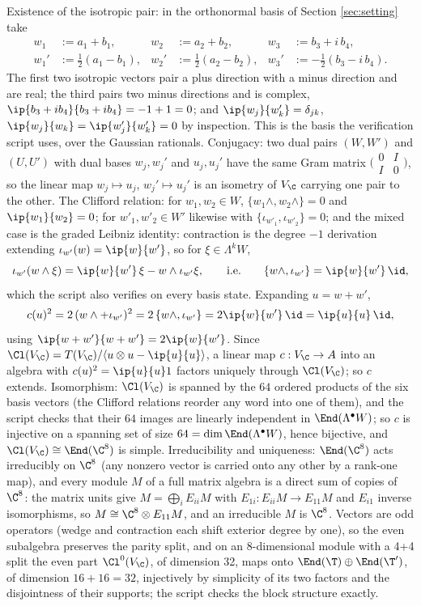 Existence of the isotropic pair: in the orthonormal basis of Section \ref{sec:setting} take
\begin{align*}
w_1 &:= a_1 + b_1, & w_2 &:= a_2 + b_2, & w_3 &:= b_3 + i\,b_4,\\
w_1' &:= \tfrac12(a_1 - b_1), & w_2' &:= \tfrac12(a_2 - b_2), & w_3' &:= -\tfrac12(b_3 - i\,b_4).
\end{align*}
The first two isotropic vectors pair a plus direction with a minus direction and are real; the third pairs two minus directions and is complex, $\ip{b_3 + ib_4}{b_3 + ib_4} = -1 + 1 = 0$; and $\ip{w_j}{w_k'} = \delta_{jk}$, $\ip{w_j}{w_k} = \ip{w_j'}{w_k'} = 0$ by inspection. This is the basis the verification script uses, over the Gaussian rationals. Conjugacy: two dual pairs $(W, W')$ and $(U, U')$ with dual bases $w_j, w_j'$ and $u_j, u_j'$ have the same Gram matrix $\bigl(\begin{smallmatrix} 0 & I \\ I & 0\end{smallmatrix}\bigr)$, so the linear map $w_j \mapsto u_j$, $w_j' \mapsto u_j'$ is an isometry of $V_\C$ carrying one pair to the other. The Clifford relation: for $w_1, w_2 \in W$, $\{w_1\wedge, w_2\wedge\} = 0$ and $\ip{w_1}{w_2} = 0$; for $w'_1, w'_2 \in W'$ likewise with $\{\iota_{w'_1}, \iota_{w'_2}\} = 0$; and the mixed case is the graded Leibniz identity: contraction is the degree $-1$ derivation extending $\iota_{w'}(w) = \ip{w}{w'}$, so for $\xi \in \Lambda^k W$,
\[
\iota_{w'}(w\wedge\xi) = \ip{w}{w'}\,\xi - w\wedge\iota_{w'}\xi, \qquad\text{i.e.}\qquad \{w\wedge, \iota_{w'}\} = \ip{w}{w'}\,\id ,
\]
which the script also verifies on every basis state. Expanding $u = w + w'$,
\[
c(u)^2 = 2\,(w\wedge + \iota_{w'})^2 = 2\,\{w\wedge, \iota_{w'}\} = 2\ip{w}{w'}\,\id = \ip{u}{u}\,\id ,
\]
using $\ip{w+w'}{w+w'} = 2\ip{w}{w'}$. Since $\Cl(V_\C) = T(V_\C)/\langle u\otimes u - \ip{u}{u}\rangle$, a linear map $c: V_\C \to A$ into an algebra with $c(u)^2 = \ip{u}{u}1$ factors uniquely through $\Cl(V_\C)$; so $c$ extends. Isomorphism: $\Cl(V_\C)$ is spanned by the $64$ ordered products of the six basis vectors (the Clifford relations reorder any word into one of them), and the script checks that their $64$ images are linearly independent in $\End(\Lambda^\bullet W)$; so $c$ is injective on a spanning set of size $64 = \dim \End(\Lambda^\bullet W)$, hence bijective, and $\Cl(V_\C) \cong \End(\C^8)$ is simple. Irreducibility and uniqueness: $\End(\C^8)$ acts irreducibly on $\C^8$ (any nonzero vector is carried onto any other by a rank-one map), and every module $M$ of a full matrix algebra is a direct sum of copies of $\C^8$: the matrix units give $M = \bigoplus_i E_{ii}M$ with $E_{1i}: E_{ii}M \to E_{11}M$ and $E_{i1}$ inverse isomorphisms, so $M \cong \C^8 \otimes E_{11}M$, and an irreducible $M$ is $\C^8$. Vectors are odd operators (wedge and contraction each shift exterior degree by one), so the even subalgebra preserves the parity split, and on an 8-dimensional module with a 4+4 split the even part $\Cl^0(V_\C)$, of dimension 32, maps onto $\End(\T)\oplus\End(\T')$, of dimension $16 + 16 = 32$, injectively by simplicity of its two factors and the disjointness of their supports; the script checks the block structure exactly.

